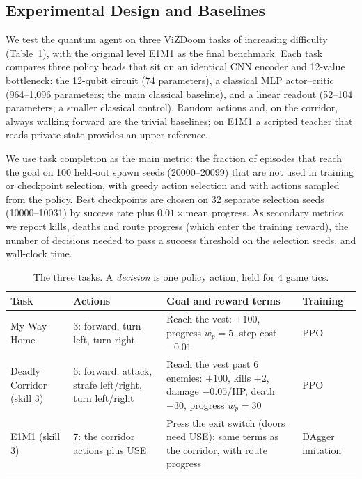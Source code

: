 \documentclass[10pt, a4paper]{article}
\begin{document}
\subsection{Experimental Design and Baselines}
We test the quantum agent on three ViZDoom tasks of increasing difficulty (Table~\ref{tab:tasks}), with the original level E1M1 as the final benchmark. Each task compares three policy heads that sit on an identical CNN encoder and 12-value bottleneck: the 12-qubit circuit (74 parameters), a classical MLP actor--critic (964--1,096 parameters; the main classical baseline), and a linear readout (52--104 parameters; a smaller classical control). Random actions and, on the corridor, always walking forward are the trivial baselines; on E1M1 a scripted teacher that reads private state provides an upper reference.

We use task completion as the main metric: the fraction of episodes that reach the goal on 100 held-out spawn seeds (20000--20099) that are not used in training or checkpoint selection, with greedy action selection and with actions sampled from the policy. Best checkpoints are chosen on 32 separate selection seeds (10000--10031) by success rate plus $0.01\times$mean progress. As secondary metrics we report kills, deaths and route progress (which enter the training reward), the number of decisions needed to pass a success threshold on the selection seeds, and wall-clock time.

\begin{table}[htbp]
\centering
\footnotesize
\renewcommand{\arraystretch}{1.1}
\caption{The three tasks. A \emph{decision} is one policy action, held for 4 game tics.}
\label{tab:tasks}
\begin{tabularx}{\textwidth}{lXXl}
\toprule
\textbf{Task} & \textbf{Actions} & \textbf{Goal and reward terms} & \textbf{Training} \\
\midrule
My Way Home & 3: forward, turn left, turn right & Reach the vest: $+100$, progress $w_p=5$, step cost $-0.01$ & PPO \\
Deadly Corridor (skill 3) & 6: forward, attack, strafe left/right, turn left/right & Reach the vest past 6 enemies: $+100$, kills $+2$, damage $-0.05$/HP, death $-30$, progress $w_p=30$ & PPO \\
E1M1 (skill 3) & 7: the corridor actions plus USE & Press the exit switch (doors need USE): same terms as the corridor, with route progress & DAgger imitation \\
\bottomrule
\end{tabularx}
\end{table}
\end{document}
